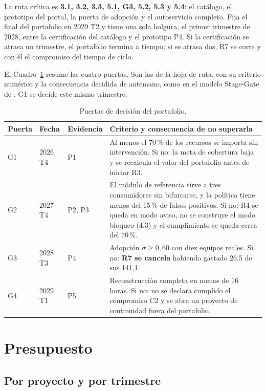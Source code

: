 \documentclass[11pt,letterpaper]{article}
\newcommand{\pct}{\,\%}
\begin{document}
La ruta crítica es \textbf{3.1, 3.2, 3.3, 5.1, G3, 5.2, 5.3 y 5.4}: el
catálogo, el prototipo del portal, la puerta de adopción y el autoservicio
completo. Fija el final del portafolio en 2029 T2 y tiene una sola holgura, el
primer trimestre de 2028, entre la certificación del catálogo y el prototipo
P4. Si la certificación se atrasa un trimestre, el portafolio termina a tiempo;
si se atrasa dos, R7 se corre y con él el compromiso del tiempo de ciclo.

El Cuadro~\ref{tab:puertas} resume las cuatro puertas. Son las de la hoja de
ruta, con su criterio numérico y la consecuencia decidida de antemano, como en
el modelo Stage-Gate de \textcite{cooper1990}. G1 se decide este mismo
trimestre.

\begin{table}[H]
\centering
\footnotesize
\setlength{\tabcolsep}{4pt}
\caption{Puertas de decisión del portafolio.}
\label{tab:puertas}
\begin{tabularx}{\textwidth}{@{}lll>{\raggedright\arraybackslash}X@{}}
\toprule
\textbf{Puerta} & \textbf{Fecha} & \textbf{Evidencia} &
  \textbf{Criterio y consecuencia de no superarla} \\
\midrule
G1 & 2026 T4 & P1 & Al menos el 70\pct{} de los recursos se importa sin
  intervención. Si no: la meta de cobertura baja y se recalcula el valor del
  portafolio antes de iniciar R3. \\
G2 & 2027 T4 & P2, P3 & El módulo de referencia sirve a tres consumidores sin
  bifurcarse, y la política tiene menos del 15\pct{} de falsos positivos. Si
  no: R4 se queda en modo aviso, no se construye el modo bloqueo (4.3) y el
  cumplimiento se queda cerca del 70\pct. \\
G3 & 2028 T3 & P4 & Adopción $\sigma \geq 0{,}60$ con diez equipos reales.
  Si no: \textbf{R7 se cancela} habiendo gastado 26,5 de sus 141,1. \\
G4 & 2029 T1 & P5 & Reconstrucción completa en menos de 16 horas. Si no: no
  se declara cumplido el compromiso C2 y se abre un proyecto de continuidad
  fuera del portafolio. \\
\bottomrule
\end{tabularx}
\end{table}

\section{Presupuesto}
\label{sec:presupuesto}

\subsection*{Por proyecto y por trimestre}
\end{document}
